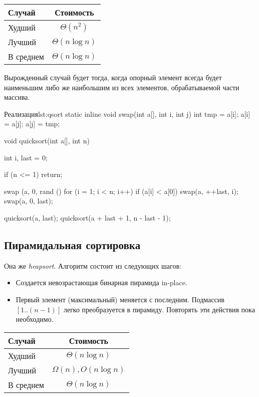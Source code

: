 \begin{center}
  \begin{tabular}{lc}
    \toprule
    Случай & Стоимость \\
    \midrule
    Худший & $\Theta(n^2)$ \\
    Лучший & $\Theta(n \log n)$ \\
    В среднем & $\Theta(n \log n)$ \\
    \bottomrule
  \end{tabular}
\end{center}

Вырожденный случай будет тогда, когда опорный элемент всегда будет наименьшим либо же наибольшим из всех элементов, обрабатываемой части массива.

\begin{clst}{Реализация}{lst:qsort}
static inline void swap(int a[], int i, int j)
{
    int tmp = a[i];
    a[i] = a[j];
    a[j] = tmp;
}

void quicksort(int a[], int n)
{
    int i, last = 0;

    if (n <= 1)
        return;

    swap (a, 0, rand () %
    for (i = 1; i < n; i++)
        if (a[i] < a[0])
            swap(a, ++last, i);
    swap(a, 0, last);

    quicksort(a, last);
    quicksort(a + last + 1, n - last - 1);
}
\end{clst}

\subsection{Пирамидальная сортировка}

Она же \emph{heapsort}. Алгоритм состоит из следующих шагов:
\begin{itemize}
  \item Создается невозрастающая бинарная пирамида in-place.
  \item Первый элемент (максимальный) меняется с последним. Подмассив $[1..(n - 1)]$ легко преобразуется в пирамиду. Повторять эти действия пока необходимо.
\end{itemize}

\begin{center}
  \begin{tabular}{lc}
    \toprule
    Случай & Стоимость \\
    \midrule
    Худший & $\Theta(n \log n)$ \\
    Лучший & $\Omega(n), O(n \log n)$ \\
    В среднем & $\Theta(n \log n)$ \\
    \bottomrule
  \end{tabular}
\end{center}

